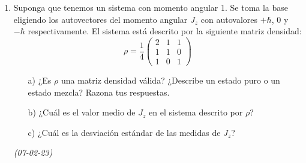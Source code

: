 \begin{enumerate}
    \item Suponga que tenemos un sistema con momento angular 1. Se toma la base eligiendo los autovectores del momento angular \( J_z \) con autovalores \( +\hbar \), \( 0 \) y \( -\hbar \) respectivamente. El sistema está descrito por la siguiente matriz densidad:
    \[
    \rho = \frac{1}{4} \begin{pmatrix} 2 & 1 & 1 \\ 1 & 1 & 0 \\ 1 & 0 & 1 \end{pmatrix}
    \]
    \begin{itemize}
        \item[a)] ¿Es \( \rho \) una matriz densidad válida? ¿Describe un estado puro o un estado mezcla? Razona tus respuestas.
        \item[b)] ¿Cuál es el valor medio de \( J_z \) en el sistema descrito por \( \rho \)?
        \item[c)] ¿Cuál es la desviación estándar de las medidas de \( J_z \)?
    \end{itemize} \textit{(07-02-23)} 
    
    

\end{enumerate}